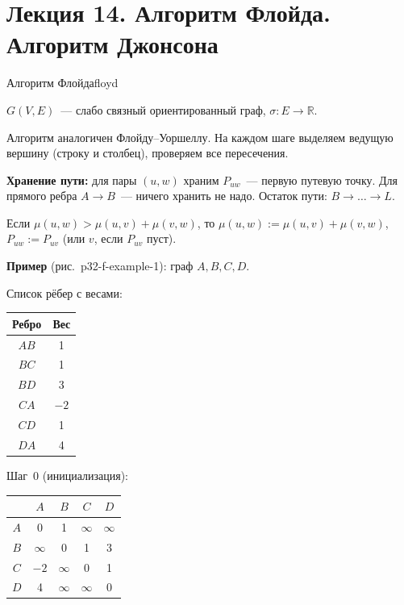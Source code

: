 
\chapter{Лекция 14. Алгоритм Флойда. Алгоритм Джонсона}


\begin{algo}{Алгоритм Флойда}{floyd}

$G(V, E)$~--- слабо связный ориентированный граф, $\sigma\colon E \to \mathbb{R}$.

Алгоритм аналогичен Флойду--Уоршеллу. На каждом шаге выделяем ведущую вершину (строку и столбец), проверяем все пересечения.

\textbf{Хранение пути:} для пары $(u, w)$ храним $P_{uw}$~--- первую путевую точку. Для прямого ребра $A \to B$~--- ничего хранить не надо. Остаток пути: $B \to \ldots \to L$.

Если $\mu(u,w) > \mu(u,v) + \mu(v,w)$, то $\mu(u,w) := \mu(u,v) + \mu(v,w)$, $P_{uw} := P_{uv}$ (или $v$, если $P_{uv}$ пуст).

\textbf{Пример} (рис.~p32-f-example-1): граф $A, B, C, D$.

Список рёбер с весами:
\begin{center}
\begin{tabular}{cc}
Ребро & Вес \\
\hline
$AB$ & 1 \\
$BC$ & 1 \\
$BD$ & 3 \\
$CA$ & $-2$ \\
$CD$ & 1 \\
$DA$ & 4 \\
\end{tabular}
\end{center}


Шаг~0 (инициализация):
\begin{center}
\begin{tabular}{c|cccc}
     & $A$      & $B$      & $C$      & $D$      \\
\hline
$A$  & 0        & 1        & $\infty$ & $\infty$ \\
$B$  & $\infty$ & 0        & 1        & 3        \\
$C$  & $-2$     & $\infty$ & 0        & 1        \\
$D$  & 4        & $\infty$ & $\infty$ & 0        \\
\end{tabular}
\end{center}


\end{algo}
